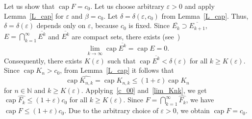 \documentclass[12pt]{article}
\let\myh\widehat
\let\myo\overline
\def\NN{\mathbb N}
\def\mcap{\operatorname{cap}}
\begin{document}
Let us show that $\mcap F =c_0$. Let us choose arbitrary $\varepsilon>0$ and apply Lemma~\ref{L_cap} for $\varepsilon$ and $\beta=c_0$. Let $\delta=\delta(\varepsilon, c_0)$ from Lemma~\ref{L_cap}. Thus, $\delta=\delta(\varepsilon)$ depends only on $\varepsilon$, because $c_0$ is fixed. Since $\myo{E_k}\supset \myo{E_{k+1}}$, $E=\bigcap_{k=1}^{\infty} \myo{E^k}$ and $\myo{E^k}$ are compact sets, there exists (see~\cite[Theorem 5.1.3]{Ra95})
\begin{equation*}
\lim\limits_{k\to\infty}\mcap \myo{E^k} = \mcap E =0.
\end{equation*}
Consequently, there exists $K(\varepsilon)$ such that $\mcap \myo{E^k}<\delta(\varepsilon)$ for all $k\geq K(\varepsilon)$. Since $\mcap K_n>c_0$, from Lemma~\ref{L_cap} it follows that
\begin{equation*}
\mcap\myh{K_{n,k}}=\mcap K_{n,k} \leq (1+\varepsilon) \mcap K_n
\end{equation*}
for $n\in\NN$ and $k\geq K(\varepsilon)$. Applying~\eqref{c_00} and~\eqref{lim_Knk}, we get $\mcap \myh{F_k}\leq (1+\varepsilon)c_0$ for all $k\geq K(\varepsilon)$.
Since $F=\bigcap\limits_{k=1}^\infty \myh{F_k}$, we have $\mcap F\leq(1+\varepsilon) c_0$. Due to the arbitrary choice of $\varepsilon>0$, we obtain $\mcap F = c_0$.
\end{document}
